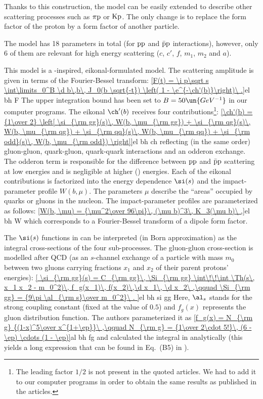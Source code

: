 Thanks to this construction, the model can be easily extended to describe other scattering processes such as $\rm \pi p$ or $\rm Kp$. The only change is to replace the form factor of the proton by a form factor of another particle.

The model has 18 parameters in total (for $\rm pp$ and $\rm \bar p p$ interactions), however, only 6 of them are relevant for high energy scattering ($c$, $c'$, $f$, $m_1$, $m_2$ and $a$).



\def\OutlineLabel{The model of Block et al.}

This model is a -inspired, eikonal-formulated model. The scattering amplitude is given in terms of the Fourier-Bessel transform:
\eqref{F(t) = \i p\sqrt s \int\limits_0^B \d b\,b\, J_0(b \sqrt{-t}) \left( 1 - \e^{-\ch'(b)}\right)\ .}{el bh F}
The upper integration bound has been set to $B = 50\un{GeV^{-1}}$ in our computer programs. The eikonal $\ch'(b)$ receives four contributions\footnote{%
The leading factor $1/2$ is not present in the quoted articles. We had to add it to our computer programs in order to obtain the same results as published in the articles.
}:
\eqref{\ch'(b) = {1\over 2} \left[
	\si_{\rm gg}(s)\, W(b, \mu_{\rm gg}) 
	+ \si_{\rm qg}(s)\, W(b, \mu_{\rm qg}) 
	+ \si_{\rm qq}(s)\, W(b, \mu_{\rm qq}) 
	+ \si_{\rm odd}(s)\, W(b, \mu_{\rm odd}) 
\right]}{el bh ch}
reflecting (in the same order) gluon-gluon, quark-gluon, quark-quark interactions and an odderon exchange. The odderon term is responsible for the difference between $\rm pp$ and $\rm\bar pp$ scattering at low energies and is negligible at higher () energies. Each of the eikonal contributions is factorized into the energy dependence $\si(s)$ and the impact-parameter profile $W(b, \mu)$. The parameters $\mu$ describe the ``areas'' occupied by quarks or gluons in the nucleon. The impact-parameter profiles are parameterized as follows:
\eqref{W(b, \mu) = {\mu^2\over 96\pi}\, (\mu b)^3\, K_3(\mu b)\ ,}{el bh W}
which corresponds to a Fourier-Bessel transform of a dipole form factor.

The $\si(s)$ functions in  can be interpreted (in Born approximation) as the integral cross-sections of the four sub-processes. The gluon-gluon cross-section is modelled after QCD (as an $s$-channel exchange of a particle with mass $m_0$ between two gluons carrying fractions $x_1$ and $x_2$ of their parent protons' energies):
\eqref{
	\si_{\rm gg}(s) = C_{\rm gg}\, \Si_{\rm gg} \int\!\!\int \Th(s\, x_1 x_2 - m_0^2)\, f_g(x_1)\, f(x_2)\,\d x_1\, \d x_2\ ,\qquad
	\Si_{\rm gg} = {9\pi \al_{\rm s}\over m_0^2}\ .
}{el bh si gg}
Here, $\al_s$ stands for the strong coupling constant (fixed at the value of $0.5$) and $f_g(x)$ represents the gluon distribution function. The authors parameterized it as
\eqref{f_g(x) = N_{\rm g} {(1-x)^5\over x^{1+\ep}}\ ,\qquad N_{\rm g} = {1\over 2\cdot 5!}\, (6 - \ep) \cdots (1 - \ep)}{al bh fg} 
and calculated the integral in  analytically (this yields a long expression that can be found in Eq.~(B5) in ).

